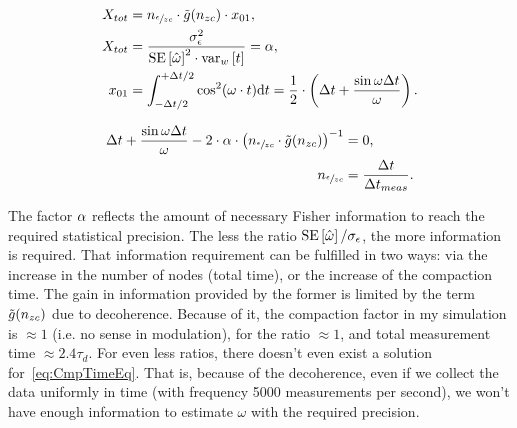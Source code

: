 \documentclass{article}
\begin{document}
%

\newcommand{\dt}{\Delta t}
\begin{align*}
	X_{tot}	&= \Nmnd\cdot \tilde{g}(\Nnd)\cdot x_{01}, \\
	X_{tot}	&= \stat = \stat*, \\
	x_{01}	&= \int_{-\dt/2}^{+\dt/2}\cos^2(\omega\cdot t)\td t = \frac12\cdot \bkt{\dt + \frac{\sin\omega\dt}{\omega}}.
\end{align*}

\begin{align}\label{eq:CmpTimeEq}
	\dt + \frac{\sin\omega\dt}{\omega} - 2\cdot \stat* \cdot \bkt{\Nmnd\cdot \tilde{g}(\Nnd)}^{-1}	&=0, \\
	\Nmnd	&= \frac{\dt}{\dt_{meas}}. \notag
\end{align}

The factor $\stat*$ reflects the amount of necessary Fisher information to reach the required statistical precision. The less the ratio $\SE{\hat{\omega}}/\SD{\meas}$, the more information is required. That information requirement can be fulfilled in two ways: via the increase in the number of nodes (total time), or the increase of the compaction time. The gain in information provided by the former is limited by the term $\tilde{g}(n_{zc})$ due to decoherence. Because of it, the compaction factor in my simulation is $\approx 1$ (i.e. no sense in modulation), for the ratio $\approx 1$, and total measurement time $\approx 2.4\tau_d$. For even less ratios, there doesn't even exist a solution for~\eqref{eq:CmpTimeEq}. That is, because of the decoherence, even if we collect the data uniformly in time (with frequency 5000 measurements per second), we won't have enough information to estimate $\omega$ with the required precision.
\end{document}

